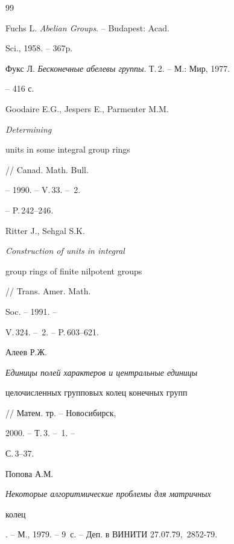\begin{thebibliography}{99}







Fuchs L. {\em Abelian Groups}. -- Budapest: Acad.


Sci., 1958. -- 367p.







Фукс Л. {\em Бесконечные абелевы группы}. Т.\,2. -- М.: Мир, 1977.


-- 416 с.







Goodaire E.G., Jespers E., Parmenter M.M. {\em Determining


units in some integral group rings} // Canad. Math. Bull.


-- 1990. -- V.\,33. -- \No\,2.


-- P.\,242--246.







Ritter J., Sehgal S.K. {\em Construction of units in integral


group rings of finite nilpotent groups} // Trans. Amer. Math.


Soc. -- 1991. --


V.\,324. -- \No\,2. -- P.\,603--621.







Алеев Р.Ж. {\em Единицы полей характеров и центральные единицы


целочисленных групповых колец конечных групп} // Матем. тр. -- Новосибирск,


2000. -- Т.\,3. -- \No\,1. --


С.\,3--37.







Попова А.М. {\em Некоторые алгоритмические проблемы для матричных


колец}. -- М., 1979. -- 9~с. -- Деп. в ВИНИТИ 27.07.79, \No\,2852-79.








\end{thebibliography}
